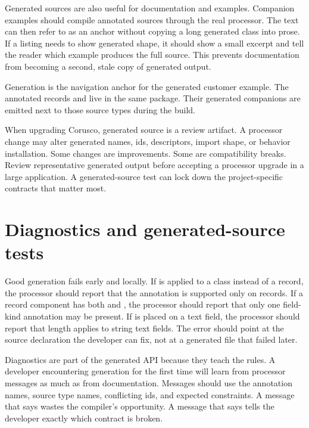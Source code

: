 Generated sources are also useful for documentation and examples. Companion
examples should compile annotated sources through the real processor. The text
can then refer to \generationExample{} as an anchor without copying a long
generated class into prose. If a listing needs to show generated shape, it
should show a small excerpt and tell the reader which example produces the
full source. This prevents documentation from becoming a second, stale copy of
generated output.

\begin{examplebox}{Generation}
\generationExample{} is the navigation anchor for the generated customer
example. The annotated records  and
 live in the same package. Their generated companions are
emitted next to those source types during the  build.
\end{examplebox}

When upgrading Corusco, generated source is a review artifact. A processor
change may alter generated names, ids, descriptors, import shape, or behavior
installation. Some changes are improvements. Some are compatibility breaks.
Review representative generated output before accepting a processor upgrade in
a large application. A generated-source test can lock down the project-specific
contracts that matter most.

\section{Diagnostics and generated-source tests}

Good generation fails early and locally. If  is applied to a
class instead of a record, the processor should report that the annotation is
supported only on records. If a record component has both  and
, the processor should report that only one field-kind
annotation may be present. If  is placed on a
 text field, the processor should report that length applies
to string text fields. The error should point at the source declaration the
developer can fix, not at a generated file that failed later.

Diagnostics are part of the generated API because they teach the rules. A
developer encountering generation for the first time will learn from processor
messages as much as from documentation. Messages should use the annotation
names, source type names, conflicting ids, and expected constraints. A message
that says  wastes the compiler's opportunity. A
message that says  tells the developer exactly which contract is broken.

